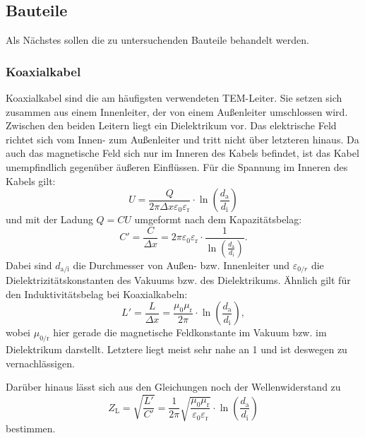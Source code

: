 \subsection{Bauteile}

	Als Nächstes sollen die zu untersuchenden Bauteile behandelt werden.
	
\subsubsection*{Koaxialkabel}

	Koaxialkabel sind die am häufigsten verwendeten TEM-Leiter.
	Sie setzen sich zusammen aus einem Innenleiter, der von einem Außenleiter umschlossen wird.
	Zwischen den beiden Leitern liegt ein Dielektrikum vor.
	Das elektrische Feld richtet sich vom Innen- zum Außenleiter und tritt nicht über letzteren hinaus.
	Da auch das magnetische Feld sich nur im Inneren des Kabels befindet, ist das Kabel unempfindlich gegenüber äußeren Einflüssen.
	Für die Spannung im Inneren des Kabels gilt:
	\begin{equation}
		U = \frac{Q}{2\pi\Delta x\varepsilon_0\varepsilon_\text{r}} \cdot \ln(\frac{d_\text{a}}{d_\text{i}})
	\end{equation}
	und mit der Ladung $Q = C U$ umgeformt nach dem Kapazitätsbelag:
	\begin{equation}
		C' = \frac{C}{\Delta x} = 2\pi\varepsilon_0\varepsilon_\text{r} \cdot\frac{1}{\ln(\frac{d_\text{a}}{d_\text{i}})}.
	\end{equation}
	Dabei sind $d_\text{a/i}$ die Durchmesser von Außen- bzw. Innenleiter und $\varepsilon_{0/r}$ die Dielektrizitätskonstanten des Vakuums bzw. des Dielektrikums.
	Ähnlich gilt für den Induktivitätsbelag bei Koaxialkabeln:
	\begin{equation}
		L' = \frac{L}{\Delta x} = \frac{\mu_0\mu_\text{r}}{2\pi}\cdot\ln(\frac{d_\text{a}}{d_\text{i}}),
	\end{equation}
	wobei $\mu_{0/\text{r}}$ hier gerade die magnetische Feldkonstante im Vakuum bzw. im Dielektrikum darstellt.
	Letztere liegt meist sehr nahe an 1 und ist deswegen zu vernachlässigen.
	
	Darüber hinaus lässt sich aus den Gleichungen noch der Wellenwiderstand zu
	\begin{equation}
		Z_\text{L} = \sqrt{\frac{L'}{C'}} = \frac{1}{2\pi} \sqrt{\frac{\mu_0\mu_{\text{r}}}{\varepsilon_0\varepsilon_\text{r}}} \cdot \ln(\frac{d_\text{a}}{d_\text{i}})
	\end{equation}
	bestimmen.
	
